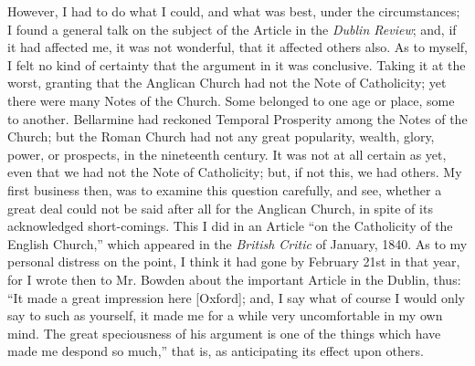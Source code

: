 However, I had to do what I could, and what was best, under the
circumstances; I found a general talk on the subject of the Article in
the \emph{Dublin Review}; and, if it had affected me, it was not wonderful,
that it affected others also. As to myself, I felt no kind of certainty
that the argument in it was conclusive. Taking it at the worst, granting
that the Anglican Church had not the Note of Catholicity; yet there were
many Notes of the Church. Some belonged to one age or place, some to
another. Bellarmine had reckoned Temporal Prosperity among the Notes of
the Church; but the Roman Church had not any great popularity, wealth,
glory, power, or prospects, in the nineteenth century. It was not at all
certain as yet, even that we had not the Note of Catholicity;
but, if not this, we had others. My first business then,
was to examine this question carefully, and see, whether a great
deal could not be said after all for the Anglican Church, in spite of
its acknowledged short-comings. This I did in an Article ``on the
Catholicity of the English Church,'' which appeared in the \emph{British
Critic} of January, 1840. As to my personal distress on the point, I
think it had gone by February 21st in that year, for I wrote then to Mr.
Bowden about the important Article in the Dublin, thus: ``It made a
great impression here [Oxford]; and, I say what of course I
would only say to such as yourself, it made me for a while very
uncomfortable in my own mind. The great speciousness of his argument is
one of the things which have made me despond so much,'' that is, as
anticipating its effect upon others.

